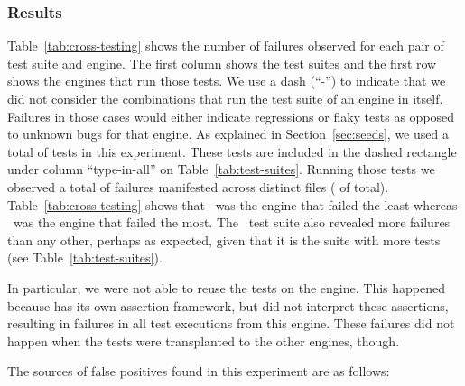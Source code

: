 \documentclass[smallextended]{svjour3}
\begin{document}
\subsubsection{Results}
\label{sec:results}

Table~\ref{tab:cross-testing} shows the number of failures observed
for each pair of test suite and engine. The first column shows the
test suites and the first row shows the engines that run those
tests. We use a dash (``-'') to indicate that we did not consider the
combinations that run the test suite of an engine in itself.  Failures
in those cases would either indicate regressions or flaky tests as
opposed to unknown bugs for that engine. As explained in
Section~\ref{sec:seeds}, we used a total of
\totalTestFilesForTestTransplantation{} tests in this
experiment. These tests are included in the dashed rectangle under
column ``type-in-all'' on Table~\ref{tab:test-suites}. Running those
tests we observed a total of \failuresTestTrans{} failures manifested
across \failuresTestTransDistictFiles{} distinct files
(\failuresTestTransPercent{} of total).  Table~\ref{tab:cross-testing}
shows that \smonkey\ was the engine that failed the least whereas
\chakra\ was the engine that failed the most. The \smonkey\ test suite
also revealed more failures than any other, perhaps as expected, given
that it is the suite with more tests (see
Table~\ref{tab:test-suites}).

In particular, we were not able to reuse the \smonkey tests on the
\hermes engine. This happened because \smonkey has its own assertion
framework, but \hermes did not interpret these assertions, resulting
in failures in all test executions from this engine. These failures
did not happen when the \smonkey tests were transplanted to the other engines,
though.




\sloppy The sources of false positives found in this experiment are as
follows:
\end{document}
